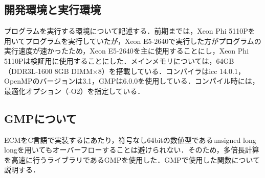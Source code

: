 \documentclass[openany,11pt,papersize]{jsbook}
\begin{document}

\subsection{開発環境と実行環境}
プログラムを実行する環境について記述する．前期までは，Xeon Phi 5110Pを用いてプログラムを実行していたが，Xeon E5-2640で実行した方がプログラムの実行速度が速かったため，Xeon E5-2640を主に使用することにし，Xeon Phi 5110Pは検証用に使用することにした．メインメモリについては，64GB（DDR3L-1600 8GB DIMM×8）を搭載している．コンパイラはicc 14.0.1，OpenMPのバージョンは3.1，GMPは6.0.0を使用している．コンパイル時には，最適化オプション（-O2）を指定している．

\subsection{GMPについて}
ECMをC言語で実装するにあたり，符号なし64bitの数値型であるunsigned long longを用いてもオーバーフローすることは避けられない．そのため，多倍長計算を高速に行うライブラリであるGMPを使用した．GMPで使用した関数について説明する．
\end{document}

